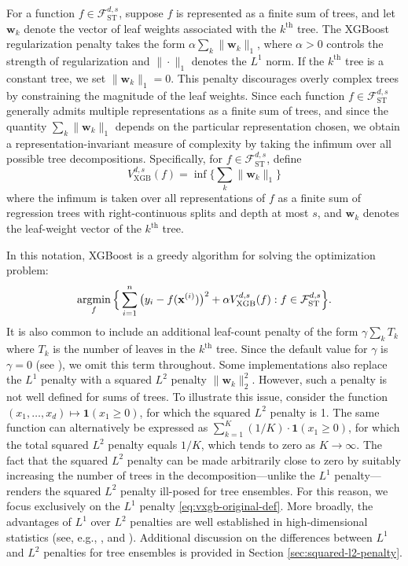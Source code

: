 \documentclass[10pt]{article}
\newcommand{\fst}{{\mathcal{F}^{d, s}_{\text{ST}}}}
\newcommand{\vxgb}{{V^{d, s}_{\text{XGB}}}}
\newcommand{\xbf}{{\mathbf{x}}}
\newcommand{\wbf}{{\mathbf{w}}}
\newcommand{\ind}{{\mathbf{1}}}
\def\argmin{\mathop{\rm argmin}}
\begin{document}
For a function $f \in \fst$, suppose $f$
is represented as a finite sum of 
trees, and let $\wbf_k$ denote the vector of leaf weights
associated with the
$k^{\text{th}}$ tree. The XGBoost regularization penalty takes the 
form $\alpha \sum_k \|\wbf_k\|_1$, where $\alpha > 0$ controls 
the strength of regularization and $\| \cdot \|_1$ denotes the 
$L^1$ norm. If the $k^{\text{th}}$ tree is a constant tree, we set 
$\|\wbf_k\|_1 = 0$. This penalty discourages overly complex 
trees by constraining the magnitude of the leaf weights. Since each 
function $f \in \fst$ generally admits multiple representations as a 
finite sum of trees, and since the quantity $\sum_k \|\wbf_k\|_1$ 
depends on the particular representation chosen, we obtain a 
representation-invariant measure of complexity by taking the infimum 
over all possible tree decompositions. Specifically, for 
$f \in \fst$, define 
\begin{equation}\label{eq:vxgb-original-def} 
    \vxgb(f) = \inf \Big\{\sum_k \|\wbf_k\|_1 \Big\}
\end{equation}
where the infimum is taken over all representations of $f$ as a 
finite sum of regression trees with right-continuous splits and 
depth at most $s$, and $\wbf_k$ denotes the leaf-weight vector 
of the $k^{\text{th}}$ tree.

In this notation, XGBoost is a greedy algorithm for solving the
optimization problem:  
\begin{equation}\label{xgb_opti}
    \argmin_{f} \Big\{\sum_{i=1}^n \big(y_i - f(\xbf^{(i)})\big)^2 
    + \alpha \vxgb(f): f \in \fst \Big\}.
\end{equation}
It is also common to include
an additional leaf-count penalty of the form $\gamma \sum_k T_k$ where 
$T_k$ is the number of leaves in the $k^{\text{th}}$ tree. Since the 
default value for $\gamma$ is $\gamma = 0$ (see 
\cite{xgboost_params_docs}), we omit this term throughout. Some 
implementations also replace the $L^1$ penalty with a squared $L^2$ 
penalty $\|\wbf_k\|_2^2$. However, such a penalty is not well 
defined for sums of trees. To illustrate this issue, consider the 
function $(x_1, \dots, x_d) \mapsto \ind(x_1 \ge 0)$, for which the 
squared $L^2$ penalty is 1. The same function can alternatively be 
expressed as $\sum_{k=1}^K (1/K) \cdot \ind(x_1 \ge 0)$, for which 
the total squared $L^2$ penalty equals $1/K$, which tends to zero as 
$K \rightarrow \infty$. The fact that the squared $L^2$ penalty can 
be made arbitrarily close to zero by suitably increasing the number of 
trees in the decomposition—unlike the $L^1$ penalty—renders the squared 
$L^2$ penalty ill-posed for tree ensembles. For this reason, we focus 
exclusively on the $L^1$ penalty \eqref{eq:vxgb-original-def}. 
More broadly, the advantages of $L^1$ over $L^2$ penalties are 
well established in high-dimensional statistics (see, e.g., 
\citet{donoho1994ideal, tibshirani1996regression, 
johnstone2011gaussian}, and \citet{tibshirani2014adaptive}). 
Additional discussion on the differences between $L^1$ and $L^2$ 
penalties for tree ensembles is provided in 
Section \ref{sec:squared-l2-penalty}. 
\end{document}
